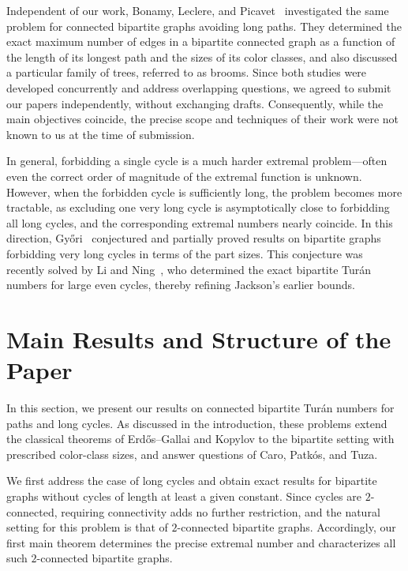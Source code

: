 \documentclass[11pt,a4paper]{article}
\begin{document}
Independent of our work, Bonamy, Leclere, and Picavet~\cite{Bonamy2025} investigated the same problem for connected bipartite graphs avoiding long paths. They determined the exact maximum number of edges in a bipartite connected graph as a function of the length of its longest path and the sizes of its color classes, and also discussed a particular family of trees, referred to as brooms. Since both studies were developed concurrently and address overlapping questions, we agreed to submit our papers independently, without exchanging drafts. Consequently, while the main objectives coincide, the precise scope and techniques of their work were not known to us at the time of submission.



In general, forbidding a single cycle is a much harder extremal problem—often even the correct order of magnitude of the extremal function is unknown.  
However, when the forbidden cycle is sufficiently long, the problem becomes more tractable, as excluding one very long cycle is asymptotically close to forbidding all long cycles, and the corresponding extremal numbers nearly coincide.  
In this direction, Győri~\cite{gyiiri1997ch} conjectured and partially proved results on bipartite graphs forbidding very long cycles in terms of the part sizes.  
This conjecture was recently solved by Li and Ning~\cite{li2021exact}, who determined the exact bipartite Turán numbers for large even cycles, thereby refining Jackson’s earlier bounds.



\section{Main Results and Structure of the Paper}

In this section, we present our results on connected bipartite Turán numbers for paths and long cycles.
As discussed in the introduction, these problems extend the classical theorems of Erd\H{o}s–Gallai and Kopylov to the bipartite setting with prescribed color-class sizes, and answer questions of Caro, Patkós, and Tuza.

We first address the case of long cycles and obtain exact results for bipartite graphs without cycles of length at least a given constant.
Since cycles are $2$-connected, requiring connectivity adds no further restriction, and the natural setting for this problem is that of $2$-connected bipartite graphs.
Accordingly, our first main theorem determines the precise extremal number and characterizes all such $2$-connected bipartite graphs.
\end{document}
